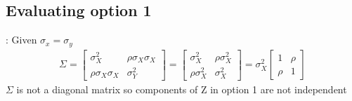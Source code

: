 \documentclass{article}
\begin{document}
\subsection{Evaluating option 1}:
Given $\sigma_x = \sigma_y$
\begin{align*}
    \Sigma = \begin{bmatrix}
    \sigma_{X}^2              &  \rho \sigma_{X} \sigma_{X} \\
    \rho \sigma_{X} \sigma_{X}  &   \sigma_{Y}^2 
\end{bmatrix} = 
    \begin{bmatrix}
    \sigma_{X}^2          &  \rho \sigma_{X}^2 \\
    \rho \sigma_{X}^2      &   \sigma_{X}^2 
\end{bmatrix} = \sigma_{X}^2 
    \begin{bmatrix}
    1          &  \rho \\
    \rho       &   1
\end{bmatrix}
\end{align*}
$\Sigma$ is not a diagonal matrix so components of Z in option 1 are not independent
\end{document}
